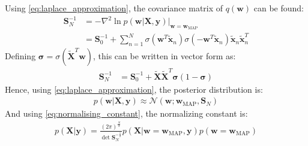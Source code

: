 \documentclass[a4paper]{article}
\begin{document}
    Using \autoref{eq:laplace_approximation}, the covariance matrix of $q(\bm{w})$ can be found:
    \begin{align}
        \bm{S}_N^{-1} &= -\nabla^2 \ln p(\bm{w} | \bm{X}, \bm{y}) \big|_{\bm{w} =\bm{w}_{\text{MAP}}} \nonumber \\
        &= \bm{S}_0^{-1}
        + \sum_{n=1}^N \sigma(\bm{w}^T \tilde{\bm{x}}_n) \sigma(-\bm{w}^T \tilde{\bm{x}}_n)\tilde{\bm{x}}_n\tilde{\bm{x}}_n^T
    \end{align}
    Defining $\bm{\sigma} = \sigma(\tilde{\bm{X}}^T \bm{w})$, this can be written in vector form as:
    \begin{align}
         \bm{S}_N^{-1} &= \bm{S}_0^{-1} + \tilde{\bm{X}}\tilde{\bm{X}}^T \bm{\sigma} (1 - \bm{\sigma})
    \end{align}
    Hence, using \autoref{eq:laplace_approximation}, the posterior distribution is:
    \begin{align}
        p(\bm{w} | \bm{X}, \bm{y}) \approx \mathcal{N}(\bm{w}; \bm{w}_\text{MAP}, \bm{S}_N)
    \end{align}
    And using \autoref{eq:normalising_constant}, the normalizing constant is:
    \begin{align}
        p(\bm{X} | \bm{y}) = \frac{(2\pi)^\frac{N}{2}}{\det \bm{S}_N^{-\frac{1}{2}}}
                            p(\bm{X} | \bm{w} = \bm{w}_\text{MAP}, \bm{y}) p(\bm{w} = \bm{w}_\text{MAP})
    \end{align}
\end{document}
